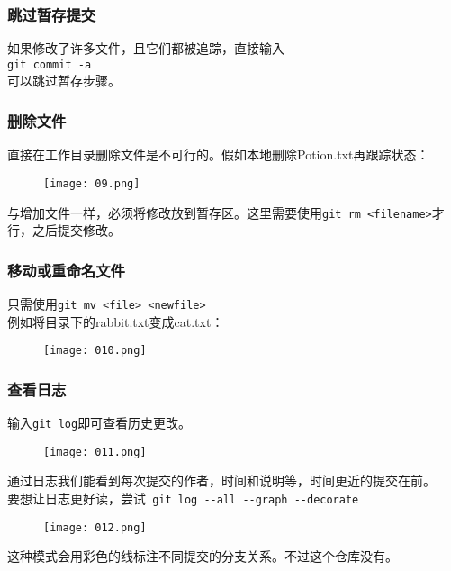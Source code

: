 \documentclass[a4paper, 12pt]{article}
\begin{document}
        \subsubsection{跳过暂存提交}
            如果修改了许多文件，且它们都被追踪，直接输入\\
            \verb|git commit -a|\\
            可以跳过暂存步骤。

        \subsubsection{删除文件}
            直接在工作目录删除文件是不可行的。假如本地删除Potion.txt再跟踪状态：\\
            \begin{figure}[H]
                \centering
                \texttt{[image: 09.png]}
                \label{img09}
            \end{figure}
            与增加文件一样，必须将修改放到暂存区。这里需要使用\verb|git rm <filename>|才行，之后提交修改。\\

        \subsubsection{移动或重命名文件}
            只需使用\verb|git mv <file> <newfile>|\\
            例如将目录下的rabbit.txt变成cat.txt：\\
            \begin{figure}[H]
                \centering
                \texttt{[image: 010.png]}
                \label{img010}
            \end{figure}

        \subsubsection{查看日志}
        输入\verb|git log|即可查看历史更改。\\
        \begin{figure}[H]
            \centering
            \texttt{[image: 011.png]}
            \label{img011}
        \end{figure}
        通过日志我们能看到每次提交的作者，时间和说明等，时间更近的提交在前。\\
        要想让日志更好读，尝试\verb| git log --all --graph --decorate|\\
        \begin{figure}[H]
            \centering
            \texttt{[image: 012.png]}
            \label{img012}
        \end{figure}
        这种模式会用彩色的线标注不同提交的分支关系。不过这个仓库没有。\\
\end{document}
